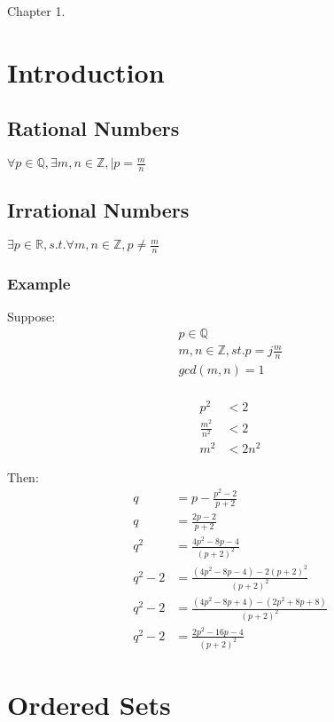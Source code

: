\documentclass{article}
\begin{document}
Chapter 1.

\section{Introduction}

\subsection{Rational Numbers}

$
	\forall p \in \mathbb{Q}, \exists m, n \in \mathbb{Z}, \mid p = \frac{m}{n}
$

\subsection{Irrational Numbers}

$
	\exists p \in \mathbb{R}, s.t. \forall m, n \in \mathbb{Z}, p \neq \frac{m}{n}
$

\subsubsection{Example}

Suppose:
\begin{align*}
	p \in \mathbb{Q} \\
	m,n \in \mathbb{Z}, st. p =j \frac{m}{n} \\
	gcd(m, n) = 1 \\
\end{align*}

\begin{align*}
	p^2 & < 2 \\
	\frac{m^2}{n^2} & < 2 \\
	m^2 & < 2 n^2
\end{align*}

Then:
\begin{align*}
	q				& = p - \frac{p^2-2}{p+2} \\
	q				& = \frac{2p-2}{p+2} \\
	q^2			& = \frac{4p^2 - 8p - 4}{(p+2)^2} \\
	q^2 - 2	& = \frac{(4p^2 - 8p - 4) - 2 (p+2)^2}{(p+2)^2} \\
	q^2 - 2	& = \frac{(4p^2 - 8p + 4) - (2p^2 + 8p + 8)}{(p+2)^2} \\
	q^2 - 2	& = \frac{2p^2 - 16p - 4}{(p+2)^2}
\end{align*}

\section{Ordered Sets}
\end{document}
